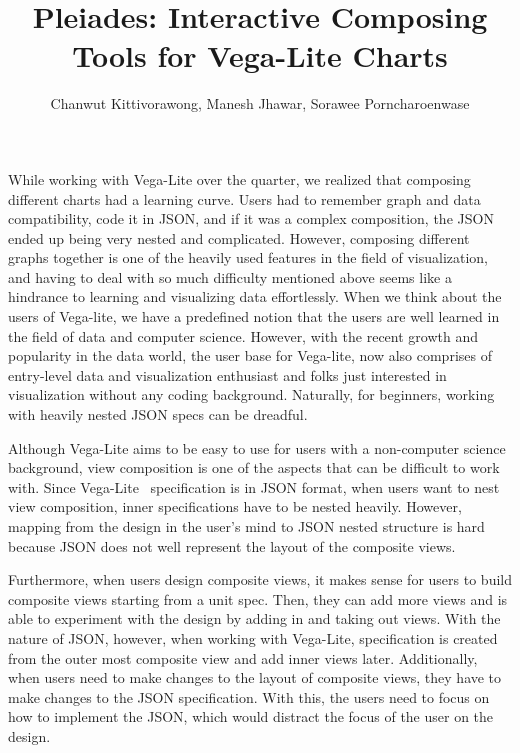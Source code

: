 \documentclass[journal]{vgtc}                %
\title{Pleiades: Interactive Composing Tools for Vega-Lite Charts}
\author{Chanwut Kittivorawong, Manesh Jhawar, Sorawee Porncharoenwase}
\begin{document}


\maketitle

While working with Vega-Lite over the quarter, we realized that composing
different charts had a learning curve. Users had to remember graph and data
compatibility, code it in JSON, and if it was a complex composition, the JSON
ended up being very nested and complicated. However, composing different graphs
together is one of the heavily used features in the field of visualization, and
having to deal with so much difficulty mentioned above seems like a hindrance to
learning and visualizing data effortlessly. When we think about the users of
Vega-lite, we have a predefined notion that the users are well learned in the
field of data and computer science. However, with the recent growth and popularity
in the data world, the user base for Vega-lite, now also comprises of entry-level
data and visualization enthusiast and folks just interested in visualization without
any coding background. Naturally, for beginners, working with heavily nested JSON
specs can be dreadful. 

Although Vega-Lite aims to be easy to use for users with a non-computer science
background, view composition is one of the aspects that can be difficult to work
with. Since Vega-Lite~\cite{notes2002} specification is in JSON format, when users
want to nest view composition, inner specifications have to be nested heavily.
However, mapping from the design in the user’s mind to JSON nested structure is
hard because JSON does not well represent the layout of the composite views.

Furthermore, when users design composite views, it makes sense for users to build
composite views starting from a unit spec. Then, they can add more views and is
able to experiment with the design by adding in and taking out views. With the
nature of JSON, however, when working with Vega-Lite, specification is created
from the outer most composite view and add inner views later. Additionally, when
users need to make changes to the layout of composite views, they have to make
changes to the JSON specification. With this, the users need to focus on how to
implement the JSON, which would distract the focus of the user on the design.
\end{document}

